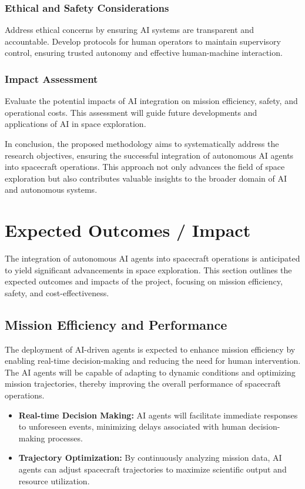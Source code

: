 \documentclass[a4paper,12pt]{article}
\begin{document}
\subsubsection{Ethical and Safety Considerations}

Address ethical concerns by ensuring AI systems are transparent and accountable. Develop protocols for human operators to maintain supervisory control, ensuring trusted autonomy and effective human-machine interaction.

\subsubsection{Impact Assessment}

Evaluate the potential impacts of AI integration on mission efficiency, safety, and operational costs. This assessment will guide future developments and applications of AI in space exploration.

In conclusion, the proposed methodology aims to systematically address the research objectives, ensuring the successful integration of autonomous AI agents into spacecraft operations. This approach not only advances the field of space exploration but also contributes valuable insights to the broader domain of AI and autonomous systems.



\section{Expected Outcomes / Impact}

The integration of autonomous AI agents into spacecraft operations is anticipated to yield significant advancements in space exploration. This section outlines the expected outcomes and impacts of the project, focusing on mission efficiency, safety, and cost-effectiveness.

\subsection{Mission Efficiency and Performance}

The deployment of AI-driven agents is expected to enhance mission efficiency by enabling real-time decision-making and reducing the need for human intervention. The AI agents will be capable of adapting to dynamic conditions and optimizing mission trajectories, thereby improving the overall performance of spacecraft operations. 

\begin{itemize}
    \item \textbf{Real-time Decision Making:} AI agents will facilitate immediate responses to unforeseen events, minimizing delays associated with human decision-making processes.
    \item \textbf{Trajectory Optimization:} By continuously analyzing mission data, AI agents can adjust spacecraft trajectories to maximize scientific output and resource utilization.
\end{itemize}
\end{document}

